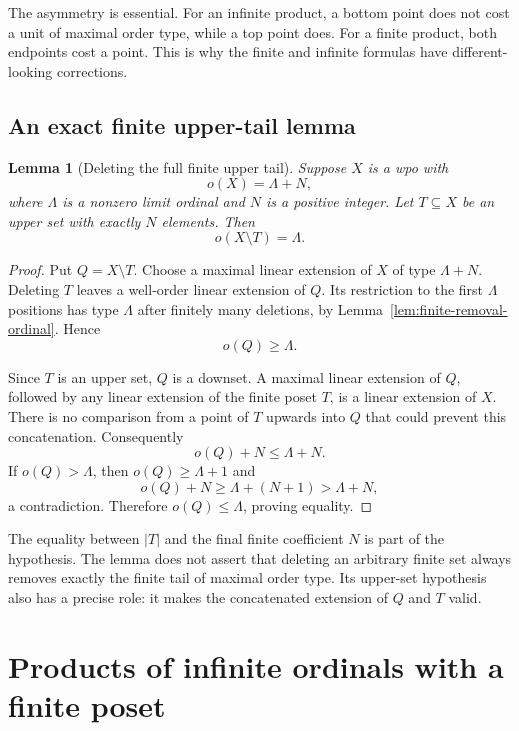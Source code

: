 \documentclass[11pt,letterpaper]{article}
\newtheorem{lemma}[theorem]{Lemma}
\theoremstyle{definition}
\theoremstyle{remark}
\begin{document}
The asymmetry is essential. For an infinite product, a bottom point does
not cost a unit of maximal order type, while a top point does. For a finite
product, both endpoints cost a point. This is why the finite and infinite
formulas have different-looking corrections.

\subsection{An exact finite upper-tail lemma}

\begin{lemma}[Deleting the full finite upper tail]\label{lem:upper-tail}
Suppose $X$ is a wpo with
\[
 o(X)=\Lambda+N,
\]
where $\Lambda$ is a nonzero limit ordinal and $N$ is a positive integer.
Let $T\subseteq X$ be an upper set with exactly $N$ elements. Then
\begin{equation}\label{eq:core-mot}
 o(X\setminus T)=\Lambda.
\end{equation}
\end{lemma}
\begin{proof}
Put $Q=X\setminus T$. Choose a maximal linear extension of $X$ of type
$\Lambda+N$. Deleting $T$ leaves a well-order linear extension of $Q$.
Its restriction to the first $\Lambda$ positions has type $\Lambda$ after
finitely many deletions, by Lemma~\ref{lem:finite-removal-ordinal}. Hence
\[
 o(Q)\ge\Lambda.
\]

Since $T$ is an upper set, $Q$ is a downset. A maximal linear extension of
$Q$, followed by any linear extension of the finite poset $T$, is a linear
extension of $X$. There is no comparison from a point of $T$ upwards into
$Q$ that could prevent this concatenation. Consequently
\[
 o(Q)+N\le\Lambda+N.
\]
If $o(Q)>\Lambda$, then $o(Q)\ge\Lambda+1$ and
\[
 o(Q)+N\ge\Lambda+(N+1)>\Lambda+N,
\]
a contradiction. Therefore $o(Q)\le\Lambda$, proving equality.
\end{proof}

The equality between $|T|$ and the final finite coefficient $N$ is part of
the hypothesis. The lemma does not assert that deleting an arbitrary
finite set always removes exactly the finite tail of maximal order type.
Its upper-set hypothesis also has a precise role: it makes the
concatenated extension of $Q$ and $T$ valid.

\section{Products of infinite ordinals with a finite poset}\label{sec:mixed}
\end{document}
